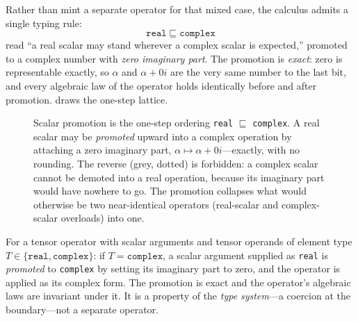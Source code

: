 Rather than mint a separate operator for that mixed case, the calculus admits
a single typing rule:
\[
  \boxed{\ \texttt{real} \;\sqsubseteq\; \texttt{complex}\ }
\]
read ``a real scalar may stand wherever a complex scalar is expected,''
promoted to a complex number with \emph{zero imaginary part}. The promotion is
\emph{exact}: zero is representable exactly, so $\alpha$ and $\alpha + 0i$ are
the very same number to the last bit, and every algebraic law of the operator
holds identically before and after promotion.  draws the
one-step lattice.

\begin{figure}[t]
\centering
{}
\caption[The scalar-promotion lattice]{Scalar promotion is the one-step
ordering \texttt{real} $\sqsubseteq$ \texttt{complex}. A real scalar may be
\emph{promoted} upward into a complex operation by attaching a zero imaginary
part, $\alpha \mapsto \alpha + 0i$---exactly, with no rounding. The reverse
(grey, dotted) is forbidden: a complex scalar cannot be demoted into a real
operation, because its imaginary part would have nowhere to go. The promotion
collapses what would otherwise be two near-identical operators (real-scalar
and complex-scalar overloads) into one.}
\label{fig:sh-lattice}
\end{figure}

\begin{definition}
\label{def:sh-promotion}
For a tensor operator with scalar arguments and tensor operands of element
type $T \in \{\texttt{real}, \texttt{complex}\}$:
if $T = \texttt{complex}$, a scalar argument supplied as \texttt{real} is
\emph{promoted} to \texttt{complex} by setting its imaginary part to zero, and
the operator is applied as its complex form. The promotion is exact and the
operator's algebraic laws are invariant under it. It is a property of the
\emph{type system}---a coercion at the boundary---not a separate operator.
\end{definition}

